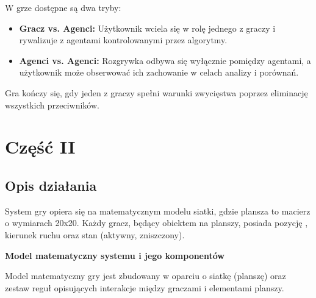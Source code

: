 \documentclass[12pt,a4paper]{article}
\begin{document}
W grze dostępne są dwa tryby:
    \begin{itemize}
        \item \textbf{Gracz vs. Agenci:} Użytkownik wciela się w rolę jednego z graczy i rywalizuje z agentami kontrolowanymi przez algorytmy.
        \item \textbf{Agenci vs. Agenci:} Rozgrywka odbywa się wyłącznie pomiędzy agentami, a użytkownik może obserwować ich zachowanie w celach analizy i porównań.
    \end{itemize}

Gra kończy się, gdy jeden z graczy spełni warunki zwycięstwa poprzez eliminację wszystkich przeciwników.


	\newpage
	\section*{Część II}
	\subsection*{Opis działania} 
	System gry opiera się na matematycznym modelu siatki, gdzie plansza to macierz o wymiarach 20x20. Każdy gracz, będący obiektem na planszy, posiada pozycję , kierunek ruchu oraz stan (aktywny, zniszczony).
    \bigskip
	
	\textbf{Model matematyczny systemu i jego komponentów}

Model matematyczny gry jest zbudowany w oparciu o siatkę (planszę) oraz zestaw reguł opisujących interakcje między graczami i elementami planszy.
\end{document}
